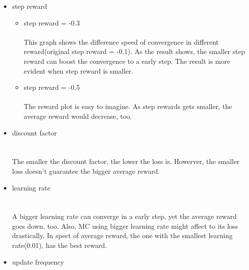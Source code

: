 \documentclass[a4paper]{article}
\begin{document}
    \begin{answer}
		\begin{itemize}
			\item step reward\\
				\begin{itemize}
					\item step reward = -0.3\\
						\\
						This graph shows the difference speed of convergence in different reward(original step reward = -0.1). As the result shows, the smaller step reward can boost the convergence to a early step. The result is more evident when step reward is smaller. 
					\item step reward = -0.5\\
						\\
						The reward plot is easy to imagine. As step rewards gets smaller, the average reward would decrease, too.\\
				\end{itemize}
			\item discount factor\\
				\\ 
				\\ 
				The smaller the discount factor, the lower the loss is. Howerver, the smaller loss doesn't guarantee the bigger average reward.
			\item learning rate\\
				\\ 
				\\ 
				A bigger learning rate can converge in a early step, yet the average reward goes down, too. Also, MC using bigger learning rate might affect to its loss drastically. In spect of average reward, the one with the smallest learning rate(0.01), has the best reward.
			\item update frequency\\ 
				\\ 

\end{itemize}
\end{answer}
\end{document}
